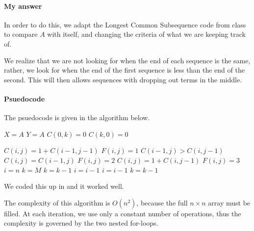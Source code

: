 \documentclass{article}
\begin{document}
\paragraph{My answer}
In order to do this, we adapt the Longest Common Subsequence code from
class to compare $A$ with itself, and changing the criteria of what we
are keeping track of.

We realize that we are not looking for when the end of each sequence
is the same, rather, we look for when the end of the first sequence is
less than the end of the second.  This will then  allows
sequences with dropping out terms in the middle.

\paragraph{Psuedocode} The psuedocode is given in the algorithm
below. 

{\singlespacing
\begin{algorithmic}
    \State $X = A$
    \State $Y = A$
      \State $C(0,k) = 0$
      \State $C(k,0) = 0$
    \EndFor
    
          \State $C(i,j) = 1+C(i-1,j-1)$
          \State $F(i,j) = 1$
        \Else
          \If $C(i-1,j) > C(i,j-1)$
            \State $C(i,j) = C(i-1,j)$
            \State $F(i,j) = 2$
          \Else
            \State $C(i,j) = 1+C(i,j-1)$
            \State $F(i,j) = 3$
          \EndIf
        \EndIf
      \EndFor
    \EndFor
    \State $i = n$
    \State $k = M$
        \State {}
        \State $k = k-1$
        \State $i = i-1$
      \Else
          \State $i = i-1$
        \Else {}
          \State $k = k-1$
        \EndIf
      \EndIf
    \EndWhile
\EndFunction    
\end{algorithmic}
}

We coded this up in \matlab{} and it worked well. 

The complexity of this algorithm is $O(n^2)$, because the full
$n\times n$ array must be filled. At each iteration, we use only a
constant number of operations, thus the complexity is governed by the
two nested for-loops.
\end{document}
